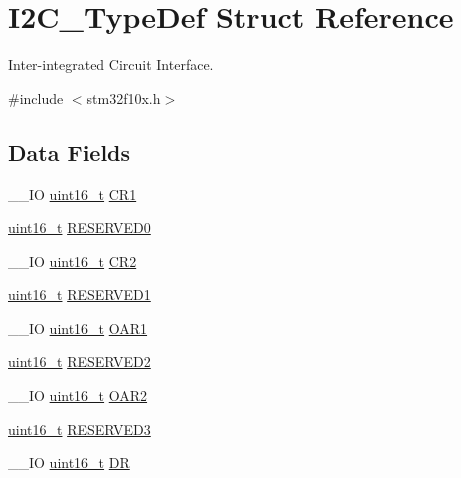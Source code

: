 \hypertarget{struct_i2_c___type_def}{\section{I2\-C\-\_\-\-Type\-Def Struct Reference}
\label{struct_i2_c___type_def}
}


Inter-\/integrated Circuit Interface.  




{\ttfamily \#include $<$stm32f10x.\-h$>$}

\subsection*{Data Fields}
\begin{DoxyCompactItemize}
\item 
\-\_\-\-\_\-\-I\-O \hyperlink{stdint_8h_a273cf69d639a59973b6019625df33e30}{uint16\-\_\-t} \hyperlink{struct_i2_c___type_def_ad35ea0b199cefb757de20e9b78168534}{C\-R1}
\item 
\hyperlink{stdint_8h_a273cf69d639a59973b6019625df33e30}{uint16\-\_\-t} \hyperlink{struct_i2_c___type_def_aee6ec4cf81ee0bb5b038576ba0d738a2}{R\-E\-S\-E\-R\-V\-E\-D0}
\item 
\-\_\-\-\_\-\-I\-O \hyperlink{stdint_8h_a273cf69d639a59973b6019625df33e30}{uint16\-\_\-t} \hyperlink{struct_i2_c___type_def_ac8bff45acc455489620d50e697a24c9d}{C\-R2}
\item 
\hyperlink{stdint_8h_a273cf69d639a59973b6019625df33e30}{uint16\-\_\-t} \hyperlink{struct_i2_c___type_def_a6c3d147223993f2b832b508ee5a5178e}{R\-E\-S\-E\-R\-V\-E\-D1}
\item 
\-\_\-\-\_\-\-I\-O \hyperlink{stdint_8h_a273cf69d639a59973b6019625df33e30}{uint16\-\_\-t} \hyperlink{struct_i2_c___type_def_ad218fdcb9606477c1d63f8ee38d3c5c9}{O\-A\-R1}
\item 
\hyperlink{stdint_8h_a273cf69d639a59973b6019625df33e30}{uint16\-\_\-t} \hyperlink{struct_i2_c___type_def_a5e98c83a176deeb4a8a68f9ca12fdfd2}{R\-E\-S\-E\-R\-V\-E\-D2}
\item 
\-\_\-\-\_\-\-I\-O \hyperlink{stdint_8h_a273cf69d639a59973b6019625df33e30}{uint16\-\_\-t} \hyperlink{struct_i2_c___type_def_a03189e2a57c81ae5d103739b72f52c93}{O\-A\-R2}
\item 
\hyperlink{stdint_8h_a273cf69d639a59973b6019625df33e30}{uint16\-\_\-t} \hyperlink{struct_i2_c___type_def_a355b2c5aa0dd467de1f9dea4a9afe986}{R\-E\-S\-E\-R\-V\-E\-D3}
\item 
\-\_\-\-\_\-\-I\-O \hyperlink{stdint_8h_a273cf69d639a59973b6019625df33e30}{uint16\-\_\-t} \hyperlink{struct_i2_c___type_def_a5c1551b886fbb8e801b9203f6d7dc7c5}{D\-R}

\end{DoxyCompactItemize}
